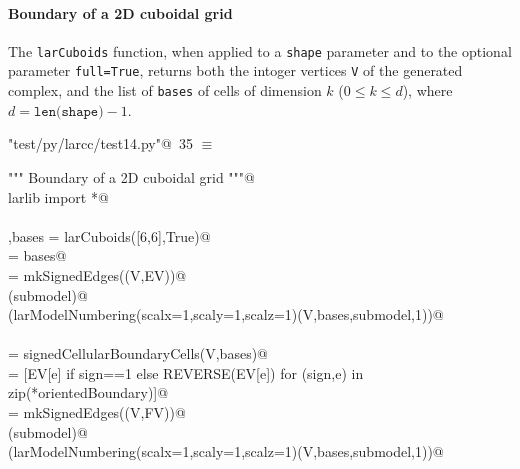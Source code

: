 \documentclass[11pt,oneside]{article}	%
\begin{document}
\paragraph{Boundary of a 2D cuboidal grid}
The \texttt{larCuboids} function, when applied to a \texttt{shape} parameter and to the optional parameter \texttt{full=True}, returns both the intoger vertices \texttt{V} of the generated complex, and the list of \texttt{bases} of cells of dimension $k$ ($0\leq k\leq d$), where $d = \texttt{len(shape)}-1$.

\begin{flushleft} \small \label{scrap56}
\protect{}\verb@"test/py/larcc/test14.py"@\nobreak\ {\footnotesize 35 }$\equiv$
\vspace{-1ex}
\begin{list}{}{} \item
\mbox{}\verb@""" Boundary of a 2D cuboidal grid """@\\
\mbox{}\verb@from larlib import *@\\
\mbox{}\verb@@\\
\mbox{}\verb@V,bases = larCuboids([6,6],True)@\\
\mbox{}\verb@[VV,EV,FV] = bases@\\
\mbox{}\verb@submodel = mkSignedEdges((V,EV))@\\
\mbox{}\verb@VIEW(submodel)@\\
\mbox{}\verb@VIEW(larModelNumbering(scalx=1,scaly=1,scalz=1)(V,bases,submodel,1))@\\
\mbox{}\verb@@\\
\mbox{}\verb@orientedBoundary = signedCellularBoundaryCells(V,bases)@\\
\mbox{}\verb@FV = [EV[e] if sign==1 else REVERSE(EV[e])  for (sign,e) in zip(*orientedBoundary)]@\\
\mbox{}\verb@submodel = mkSignedEdges((V,FV))@\\
\mbox{}\verb@VIEW(submodel)@\\
\mbox{}\verb@VIEW(larModelNumbering(scalx=1,scaly=1,scalz=1)(V,bases,submodel,1))@\\
\mbox{}\verb@@{\NWsep}
\end{list}
\vspace{-2ex}
\end{flushleft}
\end{document}
